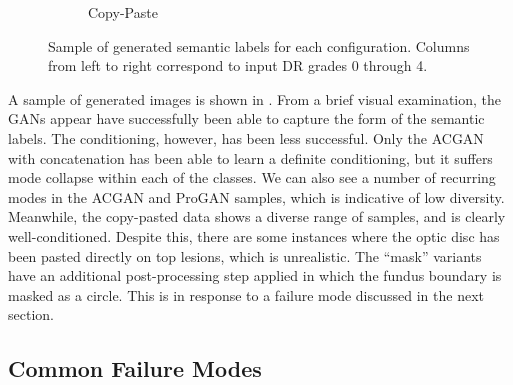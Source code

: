 \begin{figure}[h]
\begin{subfigure}{0.31\textwidth}
        \caption{Copy-Paste}
        \label{fig:copypaste_sample}
    \end{subfigure}
    \caption{Sample of generated semantic labels for each configuration. Columns from left to right correspond to input DR grades 0 through 4.}
    \label{fig:semantic_label_sample}
\end{figure}

A sample of generated images is shown in .
From a brief visual examination, the GANs appear have successfully been able to capture the form of the semantic labels.
The conditioning, however, has been less successful.
Only the ACGAN with concatenation has been able to learn a definite conditioning, but it suffers mode collapse within each of the classes.
We can also see a number of recurring modes in the ACGAN and ProGAN samples, which is indicative of low diversity.
Meanwhile, the copy-pasted data shows a diverse range of samples, and is clearly well-conditioned. 
Despite this, there are some instances where the optic disc has been pasted directly on top lesions, which is unrealistic.
The ``mask'' variants have an additional post-processing step applied in which the fundus boundary is masked as a circle.
This is in response to a failure mode discussed in the next section.

\subsection{Common Failure Modes}

